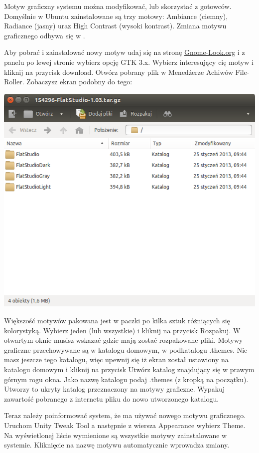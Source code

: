 Motyw graficzny systemu można modyfikować, lub skorzystać z gotowców. Domyślnie w Ubuntu zainstalowane są trzy motowy: Ambiance (ciemny), Radiance (jasny) uraz High Contrast (wysoki kontrast). Zmiana motywu graficznego odbywa się w .

Aby pobrać i zainstalować nowy motyw udaj się na stronę \href{http://gnome-look.org/}{Gnome-Look.org} i z panelu po lewej stronie wybierz opcję GTK 3.x. Wybierz interesujący cię motyw i kliknij na przycisk \textcolor{ubuntu_orange}{download}. Otwórz pobrany plik w Menedżerze Achiwów File-Roller. Zobaczysz ekran podobny do tego:
\begin{center}
\includegraphics[width=\linewidth]{images/programy_fileRoller.png}
\end{center}
Większość motywów pakowana jest w paczki po kilka sztuk różniących się kolorystyką. Wybierz jeden (lub wszystkie) i kliknij na przycisk \textcolor{ubuntu_orange}{Rozpakuj}. W otwartym oknie musisz wskazać gdzie mają zostać rozpakowane pliki. Motywy graficzne przechowywane są w katalogu domowym, w podkatalogu .themes. Nie masz jeszcze tego katalogu, więc upewnij się iż ekran został ustawiony na katalogu domowym i kliknij na przycisk \textcolor{ubuntu_orange}{Utwórz katalog} znajdujący się w prawym górnym rogu okna. Jako nazwę katalogu podaj .themes (z kropką na początku). Utworzy to ukryty katalog przeznaczony na motywy graficzne. Wypakuj zawartość pobranego z internetu pliku do nowo utworzonego katalogu.

Teraz należy poinformować system, że ma używać nowego motywu graficznego. Uruchom \textcolor{ubuntu_orange}{Unity Tweak Tool} a następnie z wiersza \textcolor{ubuntu_orange}{Appearance} wybierz \textcolor{ubuntu_orange}{Theme}. Na wyświetlonej liście wymienione są wszystkie motywy zainstalowane w systemie. Kliknięcie na nazwę motywu automatycznie wprowadza zmiany.